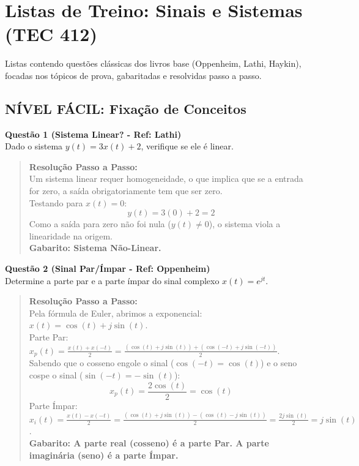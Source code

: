 \chapter{Listas de Treino: Sinais e Sistemas (TEC 412)}

Listas contendo questões clássicas dos livros base (Oppenheim, Lathi, Haykin), focadas nos tópicos de prova, gabaritadas e resolvidas passo a passo.

\section{NÍVEL FÁCIL: Fixação de Conceitos}\label{nuxedvel-fuxe1cil-fixauxe7uxe3o-de-conceitos}

\textbf{Questão 1 (Sistema Linear? - Ref: Lathi)}\\
Dado o sistema \(y(t) = 3x(t) + 2\), verifique se ele é linear.

\begin{quote}
\textbf{Resolução Passo a Passo:}\\
Um sistema linear requer homogeneidade, o que implica que se a entrada for zero, a saída obrigatoriamente tem que ser zero.\\
Testando para \(x(t) = 0\):
\[y(t) = 3(0) + 2 = 2\]
Como a saída para zero não foi nula (\(y(t) \neq 0\)), o sistema viola a linearidade na origem.\\
\textbf{Gabarito: Sistema Não-Linear.}
\end{quote}

\textbf{Questão 2 (Sinal Par/Ímpar - Ref: Oppenheim)}\\
Determine a parte par e a parte ímpar do sinal complexo \(x(t) = e^{jt}\).

\begin{quote}
\textbf{Resolução Passo a Passo:}\\
Pela fórmula de Euler, abrimos a exponencial: \(x(t) = \cos(t) + j\sin(t)\).\\
Parte Par: \(x_p(t) = \frac{x(t) + x(-t)}{2} = \frac{(\cos(t)+j\sin(t)) + (\cos(-t)+j\sin(-t))}{2}\).\\
Sabendo que o cosseno engole o sinal (\(\cos(-t)=\cos(t)\)) e o seno cospe o sinal (\(\sin(-t)=-\sin(t)\)):
\[x_p(t) = \frac{2\cos(t)}{2} = \cos(t)\]
Parte Ímpar: \(x_i(t) = \frac{x(t) - x(-t)}{2} = \frac{(\cos(t)+j\sin(t)) - (\cos(t)-j\sin(t))}{2} = \frac{2j\sin(t)}{2} = j\sin(t)\).\\
\textbf{Gabarito: A parte real (cosseno) é a parte Par. A parte imaginária (seno) é a parte Ímpar.}
\end{quote}


